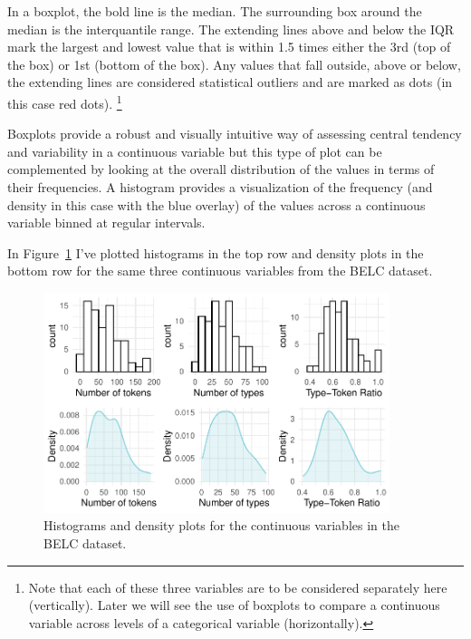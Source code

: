 \documentclass[
  letterpaper,
]{latex/krantz}
\begin{document}
In a boxplot, the bold line is the median. The surrounding box around
the median is the interquantile range. The extending lines above and
below the IQR mark the largest and lowest value that is within 1.5 times
either the 3rd (top of the box) or 1st (bottom of the box). Any values
that fall outside, above or below, the extending lines are considered
statistical outliers and are marked as dots (in this case red dots).
\footnote{Note that each of these three variables are to be considered
  separately here (vertically). Later we will see the use of boxplots to
  compare a continuous variable across levels of a categorical variable
  (horizontally).}

Boxplots provide a robust and visually intuitive way of assessing
central tendency and variability in a continuous variable but this type
of plot can be complemented by looking at the overall distribution of
the values in terms of their frequencies. A histogram provides a
visualization of the frequency (and density in this case with the blue
overlay) of the values across a continuous variable binned at regular
intervals.

In Figure~\ref{fig-summaries-histograms-belc} I've plotted histograms in
the top row and density plots in the bottom row for the same three
continuous variables from the BELC dataset.

\begin{figure}

{\centering \includegraphics[width=0.9\textwidth,height=\textheight]{./approaching-analysis_files/figure-pdf/fig-summaries-histograms-belc-1.pdf}

}

\caption{\label{fig-summaries-histograms-belc}Histograms and density
plots for the continuous variables in the BELC dataset.}

\end{figure}
\end{document}
